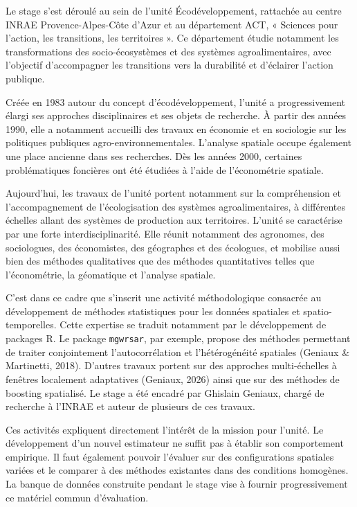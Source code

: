 \documentclass[11pt,a4paper]{article}
\begin{document}
Le stage s'est déroulé au sein de l'unité Écodéveloppement, rattachée au centre INRAE Provence-Alpes-Côte d'Azur et au département ACT, « Sciences pour l'action, les transitions, les territoires ». Ce département étudie notamment les transformations des socio-écosystèmes et des systèmes agroalimentaires, avec l'objectif d'accompagner les transitions vers la durabilité et d'éclairer l'action publique.

Créée en 1983 autour du concept d'écodéveloppement, l'unité a progressivement élargi ses approches disciplinaires et ses objets de recherche. À partir des années 1990, elle a notamment accueilli des travaux en économie et en sociologie sur les politiques publiques agro-environnementales. L'analyse spatiale occupe également une place ancienne dans ses recherches. Dès les années 2000, certaines problématiques foncières ont été étudiées à l'aide de l'économétrie spatiale.

Aujourd'hui, les travaux de l'unité portent notamment sur la compréhension et l'accompagnement de l'écologisation des systèmes agroalimentaires, à différentes échelles allant des systèmes de production aux territoires. L'unité se caractérise par une forte interdisciplinarité. Elle réunit notamment des agronomes, des sociologues, des économistes, des géographes et des écologues, et mobilise aussi bien des méthodes qualitatives que des méthodes quantitatives telles que l'économétrie, la géomatique et l'analyse spatiale.

C'est dans ce cadre que s'inscrit une activité méthodologique consacrée au développement de méthodes statistiques pour les données spatiales et spatio-temporelles. Cette expertise se traduit notamment par le développement de packages R. Le package \texttt{mgwrsar}, par exemple, propose des méthodes permettant de traiter conjointement l'autocorrélation et l'hétérogénéité spatiales (Geniaux \& Martinetti, 2018). D'autres travaux portent sur des approches multi-échelles à fenêtres localement adaptatives (Geniaux, 2026) ainsi que sur des méthodes de boosting spatialisé. Le stage a été encadré par Ghislain Geniaux, chargé de recherche à l'INRAE et auteur de plusieurs de ces travaux.

Ces activités expliquent directement l'intérêt de la mission pour l'unité. Le développement d'un nouvel estimateur ne suffit pas à établir son comportement empirique. Il faut également pouvoir l'évaluer sur des configurations spatiales variées et le comparer à des méthodes existantes dans des conditions homogènes. La banque de données construite pendant le stage vise à fournir progressivement ce matériel commun d'évaluation.
\end{document}
